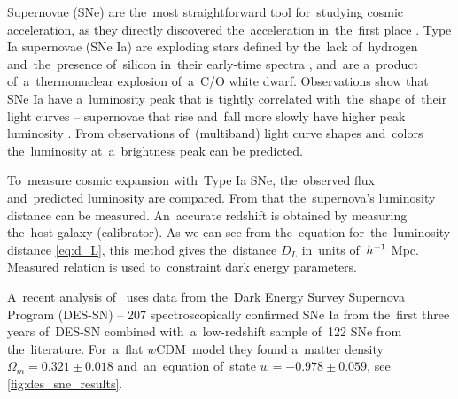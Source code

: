 \DIFaddbegin \label{ssec:supernovae}
\DIFaddend Supernovae (SNe) are the~most straightforward tool for~studying cosmic acceleration, as they directly discovered the~acceleration in~the~first place \parencite{riess}. Type Ia supernovae (SNe Ia) are exploding stars defined by the~lack of~hydrogen and~the~presence of~silicon in~their early-time spectra \parencite{SN}, and~are a~product of~a~thermonuclear explosion of~a~C/O white dwarf. Observations show that SNe Ia have a~luminosity peak that is tightly correlated with~the~shape of~their light curves -- supernovae that rise and~fall more slowly have higher peak luminosity \parencite[first quantified by][]{SN_lum}. From observations of~(multiband) light curve shapes and~colors the~luminosity at~a~brightness peak can be predicted.

To~measure cosmic expansion with~Type Ia SNe, the~observed flux and~predicted luminosity are compared. From that the~supernova's luminosity distance can be measured. An~accurate redshift is obtained by measuring the~host galaxy (calibrator). As we can see from the~equation for~the~luminosity distance \eqref{eq:d_L}, this method gives the~distance $D_L$ in~units of~$h^{-1}$ Mpc. Measured relation is used to~constraint dark energy parameters.

A~recent analysis of~\textcite{Abbott_2019} uses data from the~Dark Energy Survey Supernova Program (DES-SN) -- 207 spectroscopically confirmed SNe Ia from the~first three years of~DES-SN combined with~a~low-redshift sample of~122 SNe from the~literature. For~a~flat $w$CDM\ model they found a~matter density $\Omega_m=0.321\pm0.018$ and~an~equation of~state $w=-0.978\pm0.059$, see \autoref{fig:des_sne_results}.

